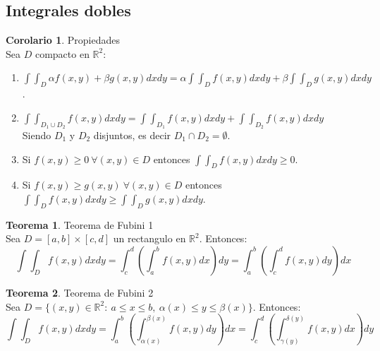 \documentclass[10pt]{article}
\theoremstyle{definition}
\newtheorem{theorem}{Teorema}[section]
\newtheorem{corollary}{Corolario}[theorem]
\begin{document}
\subsection{Integrales dobles}
\begin{corollary}{Propiedades}
    \\Sea $D$ compacto en $\mathbb{R}^2$:
    \begin{enumerate}
        \item $\int\int_D\alpha f(x,y)+\beta g(x,y)dxdy=\alpha\int\int_Df(x,y)dxdy+\beta\int\int_Dg(x,y)dxdy$.
        \item $\int\int_{D_1\cup D_2}f(x,y)dxdy=\int\int_{D_1}f(x,y)dxdy+\int\int_{D_2}f(x,y)dxdy$\\Siendo $D_1$ y $D_2$ disjuntos, es decir $D_1\cap D_2=\emptyset$.
        \item Si $f(x,y)\ge0\ \forall(x,y)\in D$ entonces $\int\int_Df(x,y)dxdy\ge0$.
        \item Si $f(x,y)\ge g(x,y)\ \forall(x,y)\in D$ entonces $\int\int_Df(x,y)dxdy\ge\int\int_Dg(x,y)dxdy$.
    \end{enumerate}
\end{corollary}
\begin{theorem}{Teorema de Fubini 1}
    \\Sea $D=[a,b]\times[c,d]$ un rectangulo en $\mathbb{R}^2$. Entonces:$$\int\int_Df(x,y)dxdy=\int_{c}^{d}\left( \int_{a}^{b} f(x,y) dx \right) dy=\int_{a}^{b} \left( \int_{c}^{d} f(x,y) dy \right)  dx$$
\end{theorem}
\begin{theorem}{Teorema de Fubini 2}
    \\Sea $D=\{(x,y)\in\mathbb{R}^2:\ a\le x\le b,\ \alpha(x)\le y\le \beta(x)\}$. Entonces: $$\int\int_Df(x,y)dxdy=\int_{a}^{b} \left( \int_{\alpha(x)}^{\beta(x)} f(x,y) dy \right)  dx=\int_{c}^{d} \left( \int_{\gamma(y)}^{\delta(y)} f(x,y) dx \right)  dy$$
\end{theorem}
\end{document}
